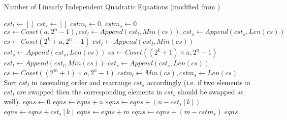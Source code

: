 \begin{algorithm}[ht!] %
\caption{Number of Linearly Independent Quadratic Equations (modified from \cite{Nawaz09-1})} 
\label{alg:quadraticNumber}
\begin{algorithmic}[1]
	\State $cst_l \gets []$
	\State $cst_s \gets []$
	\State $cstm_l \gets 0$, $cstm_s \gets 0$
	\State $cs \gets Coset(a, 2^n - 1), cst_l \gets Append(cst_l, Min(cs)),cst_s \gets Append(cst_s, Len(cs))$
		\State $cs \gets Coset(2^k + a, 2^n - 1)$ %
		\State $cst_l \gets Append(cst_l, Min(cs))$
		\State $cst_s \gets Append(cst_s, Len(cs))$
	\EndFor
		\State $cs \gets Coset((2^k + 1) \times a, 2^n - 1)$ %
		\State $cst_l \gets Append(cst_l, Min(cs))$
		\State $cst_s \gets Append(cst_s, Len(cs))$
	\EndFor
	\State $cs \gets Coset((2^m + 1) \times a, 2^n - 1)$ %
	\State $cstm_l \gets Min(cs), cstm_s \gets Len(cs)$
	\State Sort $cst_l$ in ascending order and rearrange $cst_s$ accordingly (i.e. if two elements in $cst_l$ are swapped then the
	corresponding elements in $cst_s$ should be swapped as well).
	\State $eqns \gets 0$
			\State $eqns \gets eqns + n$
		\Else
				\State $eqns \gets eqns + (n - cst_s[k])$
			\EndIf
				\State $eqns \gets eqns + cst_s[k]$
			\EndIf
		\EndIf
	\EndFor
		\State $eqns \gets eqns + m$
	\Else
			\State $eqns \gets eqns + (m - cstm_s)$
		\EndIf
	\EndIf	
	\State \Return $eqns$
\end{algorithmic}
\end{algorithm}

